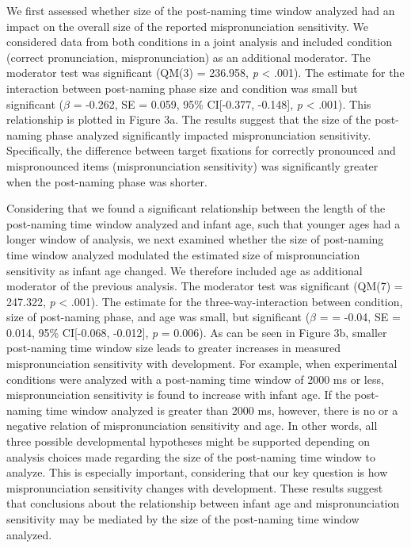 \documentclass[man]{apa6}
\theoremstyle{definition}
\theoremstyle{definition}
\theoremstyle{definition}
\theoremstyle{remark}
\begin{document}
We first assessed whether size of the post-naming time window analyzed
had an impact on the overall size of the reported mispronunciation
sensitivity. We considered data from both conditions in a joint analysis
and included condition (correct pronunciation, mispronunciation) as an
additional moderator. The moderator test was significant (QM(3) =
236.958, \emph{p} \textless{} .001). The estimate for the interaction
between post-naming phase size and condition was small but significant
(\(\beta\) = -0.262, SE = 0.059, 95\% CI{[}-0.377, -0.148{]}, \emph{p}
\textless{} .001). This relationship is plotted in Figure 3a. The
results suggest that the size of the post-naming phase analyzed
significantly impacted mispronunciation sensitivity. Specifically, the
difference between target fixations for correctly pronounced and
mispronounced items (mispronunciation sensitivity) was significantly
greater when the post-naming phase was shorter.

Considering that we found a significant relationship between the length
of the post-naming time window analyzed and infant age, such that
younger ages had a longer window of analysis, we next examined whether
the size of post-naming time window analyzed modulated the estimated
size of mispronunciation sensitivity as infant age changed. We therefore
included age as additional moderator of the previous analysis. The
moderator test was significant (QM(7) = 247.322, \emph{p} \textless{}
.001). The estimate for the three-way-interaction between condition,
size of post-naming phase, and age was small, but significant (\(\beta\)
= = -0.04, SE = 0.014, 95\% CI{[}-0.068, -0.012{]}, \emph{p} = 0.006).
As can be seen in Figure 3b, smaller post-naming time window size leads
to greater increases in measured mispronunciation sensitivity with
development. For example, when experimental conditions were analyzed
with a post-naming time window of 2000 ms or less, mispronunciation
sensitivity is found to increase with infant age. If the post-naming
time window analyzed is greater than 2000 ms, however, there is no or a
negative relation of mispronunciation sensitivity and age. In other
words, all three possible developmental hypotheses might be supported
depending on analysis choices made regarding the size of the post-naming
time window to analyze. This is especially important, considering that
our key question is how mispronunciation sensitivity changes with
development. These results suggest that conclusions about the
relationship between infant age and mispronunciation sensitivity may be
mediated by the size of the post-naming time window analyzed.
\end{document}
